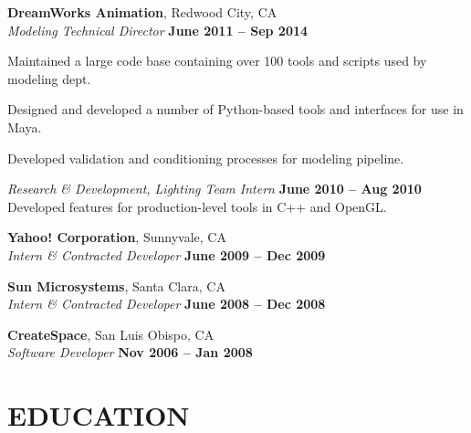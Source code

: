 \documentclass[margin,line]{resume}
\begin{document}
\begin{resume}
    \textbf{\listing DreamWorks Animation}, Redwood City, CA \vspace{2mm}\\\vspace{1mm}%
    \textsl{Modeling Technical Director} \hfill \textbf{June 2011 -- Sep 2014}\\
    \begin{list2}
        \item Maintained a large code base containing over 100 tools and scripts used by modeling dept.
        \item Designed and developed a number of Python-based tools and interfaces for use in Maya. 
        \item Developed validation and conditioning processes for modeling pipeline.
    \end{list2}

    \textsl{Research \& Development, Lighting Team Intern} \vspace{2mm}\hfill \textbf{June 2010 -- Aug 2010}\\
    Developed features for production-level tools in C++ and OpenGL.

    \textbf{\listing Yahoo! Corporation}, Sunnyvale, CA \vspace{2mm}\\\vspace{1mm}%
    \textsl{Intern \& Contracted Developer} \hfill \textbf{June 2009 -- Dec 2009}

    \textbf{\listing Sun Microsystems}, Santa Clara, CA \vspace{2mm}\\\vspace{1mm}%
    \textsl{Intern \& Contracted Developer} \hfill \textbf{June 2008 -- Dec 2008}

    \textbf{\listing CreateSpace}, San Luis Obispo, CA \vspace{2mm}\\\vspace{1mm}%
    \textsl{Software Developer} \hfill \textbf{Nov 2006 -- Jan 2008}
    

\sectionline

    \section{\mysidestyle \textbf{\large{E}\small{DUCATION}}}


\end{resume}
\end{document}
